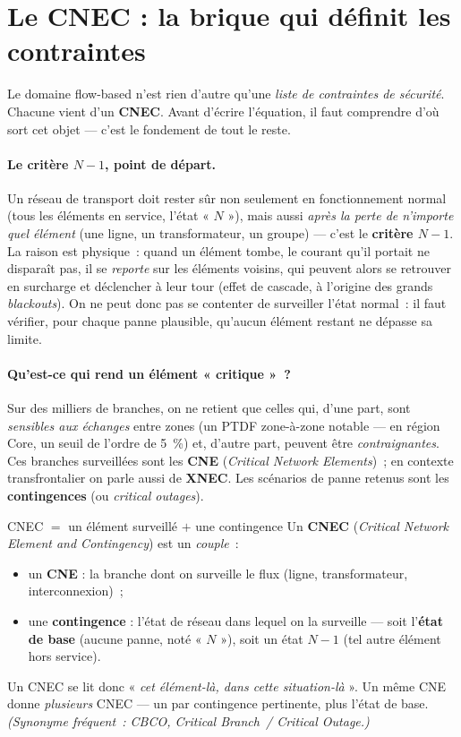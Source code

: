\documentclass[11pt,a4paper]{article}
\begin{document}
\section{Le CNEC : la brique qui définit les contraintes}

Le domaine flow-based n'est rien d'autre qu'une \emph{liste de contraintes de
sécurité}. Chacune vient d'un \textbf{CNEC}. Avant d'écrire l'équation, il faut
comprendre d'où sort cet objet — c'est le fondement de tout le reste.

\paragraph{Le critère $N\!-\!1$, point de départ.} Un réseau de transport doit
rester sûr non seulement en fonctionnement normal (tous les éléments en
service, l'état « $N$ »), mais aussi \emph{après la perte de n'importe quel
élément} (une ligne, un transformateur, un groupe) — c'est le \textbf{critère
$N\!-\!1$}. La raison est physique~: quand un élément tombe, le courant qu'il
portait ne disparaît pas, il se \emph{reporte} sur les éléments voisins, qui
peuvent alors se retrouver en surcharge et déclencher à leur tour (effet de
cascade, à l'origine des grands \emph{blackouts}). On ne peut donc pas se
contenter de surveiller l'état normal~: il faut vérifier, pour chaque panne
plausible, qu'aucun élément restant ne dépasse sa limite.

\paragraph{Qu'est-ce qui rend un élément « critique »~?} Sur des milliers de
branches, on ne retient que celles qui, d'une part, sont \emph{sensibles aux
échanges} entre zones (un PTDF zone-à-zone notable — en région Core, un seuil
de l'ordre de 5~\%) et, d'autre part, peuvent être \emph{contraignantes}. Ces
branches surveillées sont les \textbf{CNE} (\emph{Critical Network Elements})~;
en contexte transfrontalier on parle aussi de \textbf{XNEC}. Les scénarios de
panne retenus sont les \textbf{contingences} (ou \emph{critical outages}).

\begin{defbox}{CNEC $=$ un élément surveillé $+$ une contingence}
Un \textbf{CNEC} (\emph{Critical Network Element and Contingency}) est un
\emph{couple}~:
\begin{itemize}[nosep,leftmargin=1.4em]
  \item un \textbf{CNE} : la branche dont on surveille le flux (ligne,
        transformateur, interconnexion)~;
  \item une \textbf{contingence} : l'état de réseau dans lequel on la
        surveille — soit l'\textbf{état de base} (aucune panne, noté « $N$ »),
        soit un état \textbf{$N\!-\!1$} (tel autre élément hors service).
\end{itemize}
Un CNEC se lit donc « \emph{cet élément-là, dans cette situation-là} ». Un même
CNE donne \emph{plusieurs} CNEC — un par contingence pertinente, plus l'état de
base. \emph{(Synonyme fréquent~: CBCO, \emph{Critical Branch~/ Critical
Outage}.)}
\end{defbox}
\end{document}
